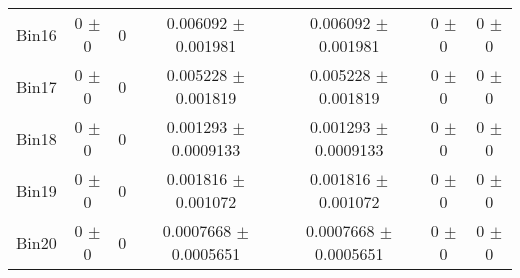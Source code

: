 \begin{tabular}{@{\extracolsep{4pt}}lcccccc@{}}
     Bin16 & 0 $\pm$ 0 & 0 & 0.006092 $\pm$ 0.001981 & 0.006092 $\pm$ 0.001981 & 0 $\pm$ 0 & 0 $\pm$ 0 \\ 
     Bin17 & 0 $\pm$ 0 & 0 & 0.005228 $\pm$ 0.001819 & 0.005228 $\pm$ 0.001819 & 0 $\pm$ 0 & 0 $\pm$ 0 \\ 
     Bin18 & 0 $\pm$ 0 & 0 & 0.001293 $\pm$ 0.0009133 & 0.001293 $\pm$ 0.0009133 & 0 $\pm$ 0 & 0 $\pm$ 0 \\ 
     Bin19 & 0 $\pm$ 0 & 0 & 0.001816 $\pm$ 0.001072 & 0.001816 $\pm$ 0.001072 & 0 $\pm$ 0 & 0 $\pm$ 0 \\ 
     Bin20 & 0 $\pm$ 0 & 0 & 0.0007668 $\pm$ 0.0005651 & 0.0007668 $\pm$ 0.0005651 & 0 $\pm$ 0 & 0 $\pm$ 0 \\ 
\hline\hline
  \end{tabular}
